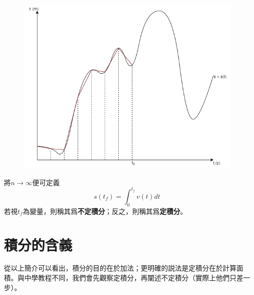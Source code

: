 \documentclass[12pt]{article}
\begin{document}
    \begin{figure}[H]
        \centering
        \includegraphics[scale=0.6]{partition s-t.png}
    \end{figure}

    將$n\to\infty$便可定義$$s(t_f)=\int_{0}^{t_f}v(t)dt$$若視$t_f$為變量，則稱其爲\textbf{不定積分}；反之，則稱其爲\textbf{定積分}。
    
    \section*{積分的含義}
    從以上簡介可以看出，積分的目的在於加法；更明確的説法是定積分在於計算面積。與中學教程不同，我們會先觀察定積分，再闡述不定積分（實際上他們只差一步）。
\end{document}
